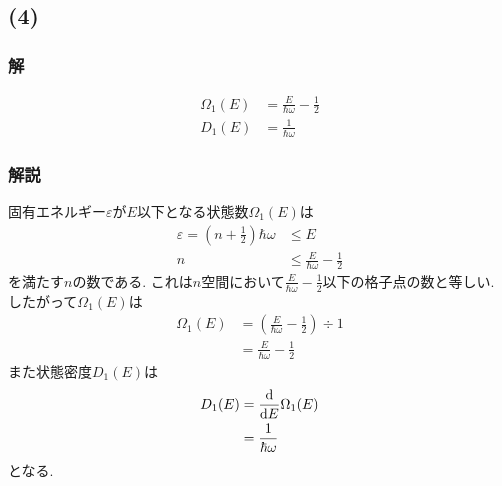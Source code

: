 \subsection*{(4)}
\subsubsection*{解}
\begin{align*}
  \Omega_1(E)&=\frac{E}{\hbar\omega}-\frac{1}{2}\\
  D_1(E)&=\frac{1}{\hbar\omega}
\end{align*}
\hrulefill
\subsubsection*{解説}
固有エネルギー$\varepsilon$が$E$以下となる状態数$\Omega_1(E)$は
\begin{align}
  \varepsilon=\left(n+\frac{1}{2}\right)\hbar\omega&\leq E\\
  n&\leq\frac{E}{\hbar\omega}-\frac{1}{2}
\end{align}
を満たす$n$の数である.
これは$n$空間において$\frac{E}{\hbar\omega}-\frac{1}{2}$以下の格子点の数と等しい.
したがって$\Omega_1(E)$は
\begin{align}
  \Omega_1(E)&=\left(\frac{E}{\hbar\omega}-\frac{1}{2}\right)\div 1\\
  &=\frac{E}{\hbar\omega}-\frac{1}{2}
\end{align}
また状態密度$D_1(E)$は
\begin{align}
  D_1(E)&=\frac{{\rm d}}{{\rm d}E}\Omega_1(E)\\
  &=\frac{1}{\hbar\omega}
\end{align}
となる.